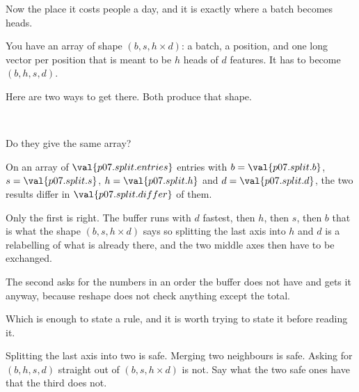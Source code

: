 \begin{fr}
Now the place it costs people a day, and it is exactly where a batch becomes
heads.

You have an array of shape $(b, s, h \times d)$: a batch, a position, and one
long vector per position that is meant to be $h$ heads of $d$ features. It has
to become $(b, h, s, d)$.

Here are two ways to get there. Both produce that shape.

\begin{center}
 \\[2pt]
\end{center}

Do they give the same array?
\dotline
\nextframe
\end{fr}

\begin{fr}
On an array of $\val{p07.split.entries}$ entries with
$b = \val{p07.split.b}$, $s = \val{p07.split.s}$, $h = \val{p07.split.h}$ and
$d = \val{p07.split.d}$, the two results differ in
$\val{p07.split.differ}$ of them.

Only the first is right. The buffer runs with $d$ fastest, then $h$, then $s$,
then $b$ \dash{} that is what the shape $(b, s, h \times d)$ says \dash{} so
splitting the last axis into $h$ and $d$ is a relabelling of what is already
there, and the two middle axes then have to be exchanged.

The second asks for the numbers in an order the buffer does not have and gets
it anyway, because reshape does not check anything except the total.
\end{fr}


\begin{fr}
Which is enough to state a rule, and it is worth trying to state it before
reading it.

Splitting the last axis into two is safe. Merging two neighbours is safe.
Asking for $(b, h, s, d)$ straight out of $(b, s, h \times d)$ is not. Say what
the two safe ones have that the third does not.
\dotline
\nextframe
\end{fr}

